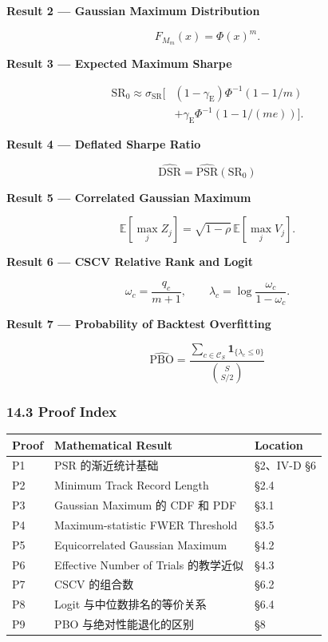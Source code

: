 \textbf{Result 2 --- Gaussian Maximum Distribution}

\[F_{M_m}(x)=\Phi(x)^m.\]

\textbf{Result 3 --- Expected Maximum Sharpe}

\[\begin{aligned}
\mathrm{SR}_0\approx
\sigma_{\mathrm{SR}}\Bigg[
&(1-\gamma_{\mathrm E})
\Phi^{-1}(1-1/m)\\
&+\gamma_{\mathrm E}
\Phi^{-1}(1-1/(me))
\Bigg].
\end{aligned}\]

\textbf{Result 4 --- Deflated Sharpe Ratio}

\[\boxed{
\widehat{\mathrm{DSR}}
=
\widehat{\mathrm{PSR}}(\mathrm{SR}_0)
}\]

\textbf{Result 5 --- Correlated Gaussian Maximum}

\[\mathbb E[\max_j Z_j]
=
\sqrt{1-\rho}\,
\mathbb E[\max_j V_j].\]

\textbf{Result 6 --- CSCV Relative Rank and Logit}

\[\omega_c=\frac{q_c}{m+1},
\qquad
\lambda_c=\log\frac{\omega_c}{1-\omega_c}.\]

\textbf{Result 7 --- Probability of Backtest Overfitting}

\[\boxed{
\widehat{\mathrm{PBO}}
=
\frac{
\sum_{c\in\mathcal C_S}
\mathbf 1_{\{\lambda_c\leq0\}}
}{
\binom S{S/2}
}
}\]

\hypertarget{part-4-71-0001-proof-index}{%
\subsubsection{14.3 Proof Index}\label{part-4-71-0001-proof-index}}

\begin{readertable}
\begin{longtable}[]{@{}
  >{\raggedright\arraybackslash}p{}
  >{\raggedright\arraybackslash}p{}
  >{\raggedright\arraybackslash}p{}@{}}
\toprule
Proof & Mathematical Result & Location \\
\midrule
\endhead
P1 & PSR 的渐近统计基础 & §2、IV-D §6 \\
P2 & Minimum Track Record Length & §2.4 \\
P3 & Gaussian Maximum 的 CDF 和 PDF & §3.1 \\
P4 & Maximum-statistic FWER Threshold & §3.5 \\
P5 & Equicorrelated Gaussian Maximum & §4.2 \\
P6 & Effective Number of Trials 的教学近似 & §4.3 \\
P7 & CSCV 的组合数 & §6.2 \\
P8 & Logit 与中位数排名的等价关系 & §6.4 \\
P9 & PBO 与绝对性能退化的区别 & §8 \\
\bottomrule
\end{longtable}
\end{readertable}

